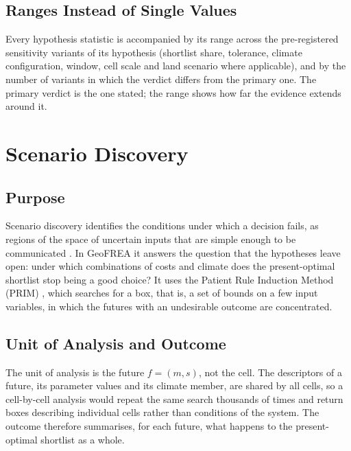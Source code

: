 \subsection{Ranges Instead of Single Values}
\label{subsec:synthesis_ranges}

Every hypothesis statistic is accompanied by its range across the pre-registered
sensitivity variants of its hypothesis (shortlist share, tolerance, climate
configuration, window, cell scale and land scenario where applicable), and by the
number of variants in which the verdict differs from the primary one. The primary
verdict is the one stated; the range shows how far the evidence extends around
it.


\section{Scenario Discovery}
\label{sec:prim}

\subsection{Purpose}
\label{subsec:prim_purpose}

Scenario discovery identifies the conditions under which a decision fails, as
regions of the space of uncertain inputs that are simple enough to be
communicated \cite{bryantlempert2010}. In GeoFREA it answers the question that
the hypotheses leave open: under which combinations of costs and climate does the
present-optimal shortlist stop being a good choice? It uses the Patient Rule
Induction Method (PRIM) \cite{friedmanfisher1999}, which searches for a box,
that is, a set of bounds on a few input variables, in which the futures with an
undesirable outcome are concentrated.

\subsection{Unit of Analysis and Outcome}
\label{subsec:prim_outcome}

The unit of analysis is the future $f=(m,s)$, not the cell. The descriptors of a
future, its parameter values and its climate member, are shared by all cells, so
a cell-by-cell analysis would repeat the same search thousands of times and
return boxes describing individual cells rather than conditions of the system.
The outcome therefore summarises, for each future, what happens to the
present-optimal shortlist as a whole.

